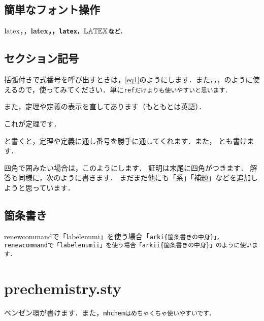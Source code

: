 \documentclass[a4paper, 9pt]{jsarticle}
\begin{document}
\subsection{簡単なフォント操作}
$\rm{latex}$，，\bf{latex}，，\tt{latex}，$\bb{LATEX}$など．
\subsection{セクション記号}
括弧付きで式番号を呼び出すときは，\ref{eq1}のようにします．また，，，のように使えるので，使ってみてください．単に\tt{ref}だけよりも使いやすいと思います．\par 
また，定理や定義の表示を直してあります（もともとは英語）．
\begin{theorem}
	これが定理です．
\end{theorem}
と書くと，定理や定義に通し番号を勝手に通してくれます．また，
とも書けます．\par 
四角で囲みたい場合は，このようにします．
証明は末尾に四角がつきます．
解答も同様に，次のように書きます．
まだまだ他にも「系」「補題」などを追加しようと思っています．
\subsection{箇条書き}
renewcommandで「labelenumi」を使う場合「\tt{arki}\{箇条書きの中身\}」，renewcommandで「labelenumii」を使う場合「\tt{arkii}\{箇条書きの中身\}」のように使います．

\section{prechemistry.sty}
ベンゼン環が書けます．また，\tt{mhchem}はめちゃくちゃ使いやすいです．\par 
{}
\end{document}
